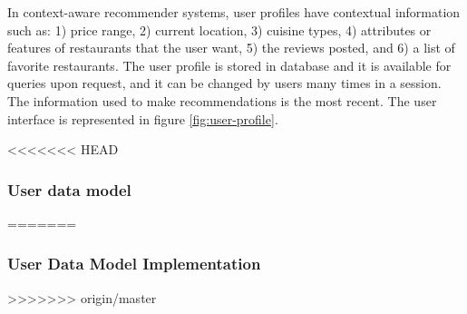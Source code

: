 In context-aware recommender systems, user profiles have contextual
information such as: 1) price range, 2) current location, 3) cuisine
types, 4) attributes or features of restaurants that the user want, 5)
the reviews posted, and 6) a list of  favorite restaurants. The user
profile is stored in database and it is available for queries upon request,
and it can be changed by users many times in a session. The
information used to make recommendations is the most recent.
The user interface is represented in figure \ref{fig:user-profile}.

<<<<<<< HEAD
\subsubsection{User data model} 
=======
\subsubsection{User Data Model Implementation} 
>>>>>>> origin/master

